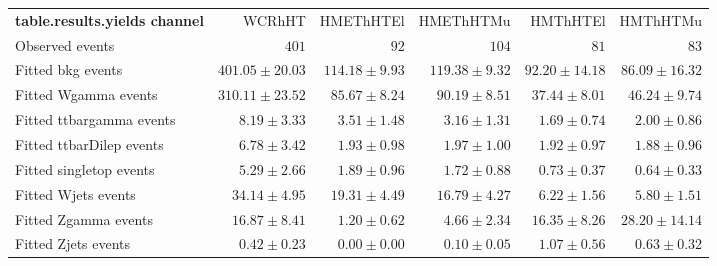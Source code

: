 

\begin{table}
\begin{center}
\setlength{\tabcolsep}{0.0pc}
{\small
\begin{tabular*}{\textwidth}{@{\extracolsep{\fill}}lrrrrr}
\noalign{\smallskip}\hline\noalign{\smallskip}
{\bf table.results.yields channel}           & WCRhHT            & HMEThHTEl            & HMEThHTMu            & HMThHTEl            & HMThHTMu              \\[-0.05cm]
\noalign{\smallskip}\hline\noalign{\smallskip}
Observed events          & $401$              & $92$              & $104$              & $81$              & $83$                    \\
\noalign{\smallskip}\hline\noalign{\smallskip}
Fitted bkg events         & $401.05 \pm 20.03$          & $114.18 \pm 9.93$          & $119.38 \pm 9.32$          & $92.20 \pm 14.18$          & $86.09 \pm 16.32$              \\
\noalign{\smallskip}\hline\noalign{\smallskip}
        Fitted Wgamma events         & $310.11 \pm 23.52$          & $85.67 \pm 8.24$          & $90.19 \pm 8.51$          & $37.44 \pm 8.01$          & $46.24 \pm 9.74$              \\
        Fitted ttbargamma events         & $8.19 \pm 3.33$          & $3.51 \pm 1.48$          & $3.16 \pm 1.31$          & $1.69 \pm 0.74$          & $2.00 \pm 0.86$              \\
        Fitted ttbarDilep events         & $6.78 \pm 3.42$          & $1.93 \pm 0.98$          & $1.97 \pm 1.00$          & $1.92 \pm 0.97$          & $1.88 \pm 0.96$              \\
        Fitted singletop events         & $5.29 \pm 2.66$          & $1.89 \pm 0.96$          & $1.72 \pm 0.88$          & $0.73 \pm 0.37$          & $0.64 \pm 0.33$              \\
        Fitted Wjets events         & $34.14 \pm 4.95$          & $19.31 \pm 4.49$          & $16.79 \pm 4.27$          & $6.22 \pm 1.56$          & $5.80 \pm 1.51$              \\
        Fitted Zgamma events         & $16.87 \pm 8.41$          & $1.20 \pm 0.62$          & $4.66 \pm 2.34$          & $16.35 \pm 8.26$          & $28.20 \pm 14.14$              \\
        Fitted Zjets events         & $0.42 \pm 0.23$          & $0.00 \pm 0.00$          & $0.10 \pm 0.05$          & $1.07 \pm 0.56$          & $0.63 \pm 0.32$              \\

\end{tabular*}}
\end{center}
\end{table}
